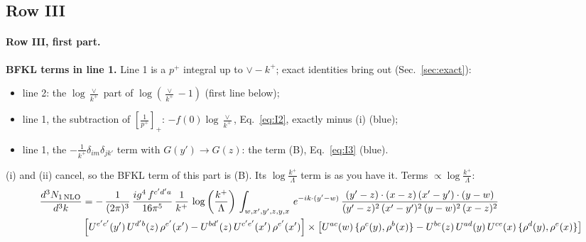 \documentclass[10pt]{article}
\numberwithin{equation}{section}
\newcommand{\new}[1]{{\color{blue}#1}}
\begin{document}
\subsection{Row III}
\paragraph{Row III, first part.}
\textbf{BFKL terms in line 1.} Line 1 is a $p^+$ integral up to $\vee-k^+$; exact identities bring out (Sec.~\ref{sec:exact}):
\begin{itemize}
\item[(i)] line 2: the $\log\frac{\vee}{k^+}$ part of $\log(\frac{\vee}{k^+}-1)$ (first line below);
\item[(ii)] line 1, the subtraction of $\left[\frac{1}{p^+}\right]_+$: $-f(0)\log\frac{\vee}{k^+}$, Eq.~\eqref{eq:I2}, exactly minus (i) (\new{blue});
\item[(iii)] line 1, the $-\frac{1}{k^+}\delta_{im}\delta_{jk'}$ term with $G(y')\to G(z)$: the term (B), Eq.~\eqref{eq:I3} (\new{blue}).
\end{itemize}
(i) and (ii) cancel, so the BFKL term of this part is (B). Its $\log\frac{k^+}{\Lambda}$ term is as you have it.
\noindent Terms $\propto\log\frac{k^+}{\Lambda}$:
\begin{align}
     \frac{d^{3}N_{1\,\rm NLO}}{d^{3}k} & =   -\,\frac{1}{(2\pi)^{3}}\, \frac{ig^{4}\,f^{c'd'a}}{16\pi^{5}}\, \frac{1}{k^{+}}\,\log{\left(\frac{k^{+}}{\Lambda}\right)}\, \int_{w,x',y',z,y,x}\, e^{-ik\cdot (y'-w)}\,\frac{(y'-z)\cdot (x-z)\,(x'-y')\cdot (y-w)}{(y'-z)^{2}\,(x'-y')^{2}\,(y-w)^{2}\,(x-z)^{2}}\notag \\ &  \left[U^{e'c'}(y')\,U^{d'b}(z)\,\rho^{e'}(x')-U^{bd'}(z)\,U^{c'e'}(x')\,\rho^{e'}(x')\right]\times  \left[U^{ac}(w)\, \{\rho^{c}(y),\rho^{b}(x)\}-U^{bc}(z)\,U^{ad}(y)\,U^{ce}(x)\,\{\rho^{d}(y),\rho^{e}(x)\}\right] \label{eq:J:G3III1}
\end{align}
\end{document}
